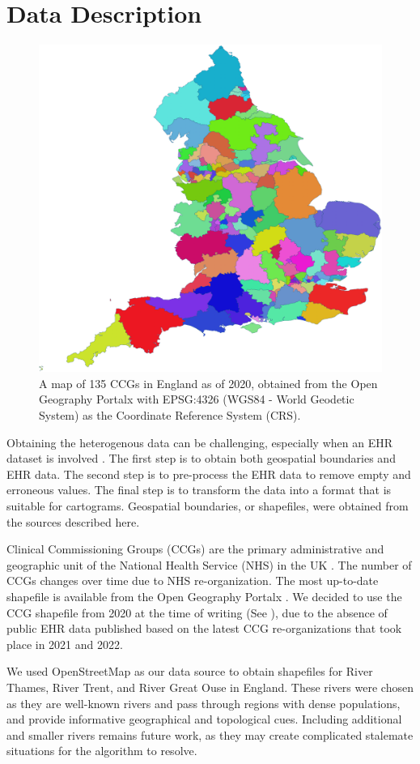 \section{Data Description}

 {
  \begin{figure}[b!]
      \centering
      \includegraphics[width=0.6\columnwidth]{figure/ccg.png}
      \caption{A map of 135 CCGs in England as of 2020, obtained from the Open Geography Portalx \cite{opengeographyportalxOpen} with EPSG:4326 (WGS84 - World Geodetic System) as the Coordinate Reference System (CRS).}
      \label{fig:ccg}
  \end{figure}
 }

Obtaining the heterogenous data can be challenging, especially when an EHR dataset is involved \cite{wang2021EHR}. The first step is to obtain both geospatial boundaries and EHR data. The second step is to pre-process the EHR data to remove empty and erroneous values. The final step is to transform the data into a format that is suitable for cartograms. Geospatial boundaries, or shapefiles, were obtained from the sources described here.

 Clinical Commissioning Groups (CCGs) are the primary administrative and geographic unit of the National Health Service (NHS) in the UK \cite{nhsNHS}. The number of CCGs changes over time due to NHS re-organization. The most up-to-date shapefile is available from the Open Geography Portalx \cite{opengeographyportalxOpen}. We decided to use the CCG shapefile from 2020 at the time of writing (See ), due to the absence of public EHR data published based on the latest CCG re-organizations that took place in 2021 and 2022.

 We used OpenStreetMap \cite{openstreetmapRelation} as our data source to obtain shapefiles for River Thames, River Trent, and River Great Ouse in England. These rivers were chosen as they are well-known rivers and pass through regions with dense populations, and provide informative geographical and topological cues. Including additional and smaller rivers remains future work, as they may create complicated stalemate situations for the algorithm to resolve.

